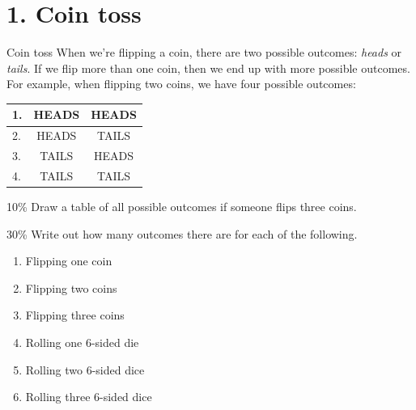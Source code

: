 \documentclass[a4paper,12pt]{book}
\begin{document}
    \section*{1. Coin toss}

        \begin{intro}{Coin toss}
            When we're flipping a coin, there are two possible outcomes:
            \textit{heads} or \textit{tails}. If we flip more than one
            coin, then we end up with more possible outcomes. For example,
            when flipping two coins, we have four possible outcomes:

            \begin{center}
                \begin{tabular}{ | l | c | c | }
                    \hline
                    1. & HEADS & HEADS \\ \hline
                    2. & HEADS & TAILS \\ \hline
                    3. & TAILS & HEADS \\ \hline
                    4. & TAILS & TAILS \\ \hline
                \end{tabular}
            \end{center}
        \end{intro}

        \begin{question}{1}{10\%}
            Draw a table of all possible outcomes if someone flips three coins.
        \end{question}

        \begin{question}{2}{30\%}
            Write out how many outcomes there are for each of the following.

            \begin{enumerate}
                \item Flipping one coin
                \item Flipping two coins
                \item Flipping three coins
                \item Rolling one 6-sided die
                \item Rolling two 6-sided dice
                \item Rolling three 6-sided dice
            \end{enumerate}
        \end{question}
\end{document}
